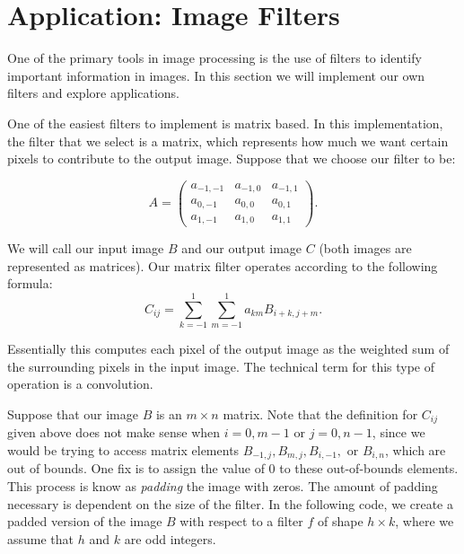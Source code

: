 \section*{Application: Image Filters}
One of the primary tools in image processing is the use of filters to identify important information 
in images. In this section we will implement our own filters and explore applications.

One of the easiest filters to implement is matrix based. In this implementation, the filter that we 
select is a matrix, which represents how much we want certain pixels to contribute to the output image. 
Suppose that we choose our filter to be:

\[
A = \begin{pmatrix}
a_{-1,-1}&a_{-1,0}&a_{-1,1}\\
a_{0,-1}&a_{0,0}&a_{0,1}\\
a_{1,-1}&a_{1,0}&a_{1,1}
\end{pmatrix}.
\]

We will call our input image $B$ and our output image $C$ (both images are represented as matrices).
Our matrix filter operates according to the following formula:
\[
C_{ij} = \sum_{k=-1}^1 \sum_{m=-1}^1 a_{km}B_{i+k,j+m}.
\]

Essentially this computes each pixel of the output image as the weighted sum of the surrounding
pixels in the input image. The technical term for this type of operation is a convolution.

Suppose that our image $B$ is an $m\times n$ matrix. Note that the definition for
$C_{ij}$ given above does not make sense when $i = 0, m-1$ or $j = 0, n-1$, since we would be trying
to access matrix elements $B_{-1,j}, B_{m,j}, B_{i,-1},$ or $B_{i,n}$, which are out of bounds.
One fix is to assign the value of 0 to these out-of-bounds elements. This process is know as \emph{padding}
the image with zeros. The amount of padding necessary is dependent on the size of the filter.
In the following code, we create a padded version of the image $B$ with respect to a filter $f$ of shape 
$h\times k$, where we assume that $h$ and $k$ are odd integers.

